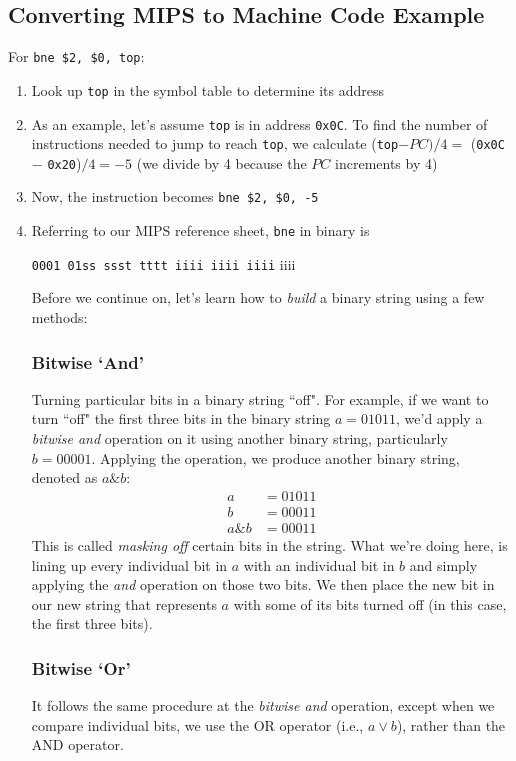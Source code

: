\documentclass{report}
\begin{document}
\subsection{Converting MIPS to Machine Code Example}
For \texttt{bne \$2, \$0, top}:
\begin{enumerate}
\item Look up \texttt{top} in the symbol table to determine its address
\item As an example, let's assume \texttt{top} is in address \texttt{0x0C}. To find the number of instructions needed to jump to reach \texttt{top}, we calculate (\texttt{top}$-PC) / 4 =$ (\texttt{0x0C} $-$ \texttt{0x20})$/ 4 = -5$ (we divide by 4 because the $PC$ increments by 4)
\item Now, the instruction becomes \texttt{bne \$2, \$0, -5}
\item Referring to our MIPS reference sheet, \texttt{bne} in binary is
\begin{center}
\texttt{0001 01ss ssst tttt iiii iiii iiii} iiii
\end{center}
Before we continue on, let's learn how to \textit{build} a binary string using a few methods:
\subsubsection{Bitwise `And'}
Turning particular bits in a binary string ``off". For example, if we want to turn ``off" the first three bits in the binary string $a = 01011$, we'd apply a \textit{bitwise and} operation on it using another binary string, particularly $b = 00001$. Applying the operation, we produce another binary string, denoted as $a \& b$:
\begin{align*}
a &= 0 1 0 1 1 \\
b &= 0 0 0 1 1 \\
a \& b &= 0 0 0 1 1
\end{align*}
This is called \textit{masking off} certain bits in the string. What we're doing here, is lining up every individual bit in $a$ with an individual bit in $b$ and simply applying the \textit{and} operation on those two bits. We then place the new bit in our new string that represents $a$ with some of its bits turned off (in this case, the first three bits).
\subsubsection{Bitwise `Or'}
It follows the same procedure at the \textit{bitwise and} operation, except when we compare individual bits, we use the OR operator (i.e., $a \vee b$), rather than the AND operator.

\end{enumerate}
\end{document}
